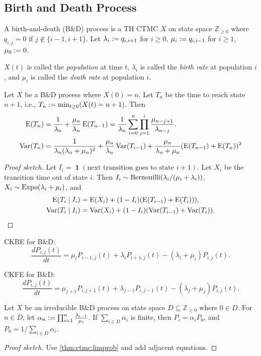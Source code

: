 \documentclass[a4paper, 12pt, fleqn]{article}
\DeclareMathOperator{\boolone}{\mathbf{1}}
\DeclareMathOperator{\Expo}{\opname{Expo}}
\begin{document}
\subsection{Birth and Death Process}

\begin{definition}
A birth-and-death (B\&D) process is a TH CTMC $X$ on state space $\mathbb{Z}_{\ge 0}$ where
$q_{i,j} = 0$ if $j \not\in \{i-1, i+1\}$. Let $\lambda_i := q_{i,i+1}$ for $i \ge 0$,
$\mu_i := q_{i,i-1}$ for $i \ge 1$, $\mu_0 := 0$.

$X(t)$ is called the \emph{population} at time $t$,
$\lambda_i$ is called the \emph{birth rate} at population $i$,
and $\mu_i$ is called the \emph{death rate} at population $i$.
\end{definition}

\begin{lemma}
Let $X$ be a B\&D process where $X(0)=n$.
Let $T_n$ be the time to reach state $n+1$, i.e., $T_n := \min_{t \ge 0} (X(t) = n+1)$. Then
\begin{align*}
\operatorname*{E}(T_n) &= \frac{1}{\lambda_n} + \frac{\mu_n}{\lambda_n}\operatorname*{E}(T_{n-1})
= \frac{1}{\lambda_n}\sum_{i=0}^n \prod_{j=1}^i \frac{\mu_{n-j+1}}{\lambda_{n-j}}.
\\ \operatorname*{Var}(T_n) &= \frac{1}{\lambda_n(\lambda_n + \mu_n)^2} + \frac{\mu_n}{\lambda_n}\operatorname*{Var}(T_{i-1})
    + \frac{\mu_n}{\lambda_n + \mu_n}(\operatorname*{E}(T_{n-1}) + \operatorname*{E}(T_n))^2
\end{align*}
\end{lemma}
\begin{proof}[Proof sketch]
Let $I_i = \boolone(\textrm{next transition goes to state } i+1)$.
Let $X_i$ be the transition time out of state $i$.
Then $I_i \sim \operatorname{Bernouilli}(\lambda_i/(\mu_i + \lambda_i))$,
$X_i \sim \Expo(\lambda_i + \mu_i)$, and
\begin{align*}
\operatorname*{E}(T_i \mid I_i) &= \operatorname*{E}(X_i) + (1-I_i)(\operatorname*{E}(T_{i-1}) + \operatorname*{E}(T_i))),
\\ \operatorname*{Var}(T_i \mid I_i) &= \operatorname*{Var}(X_i) + (1-I_i)(\operatorname*{Var}(T_{i-1}) + \operatorname*{Var}(T_i)).
\qedhere \end{align*}
\end{proof}

CKBE for B\&D:
\[ \frac{dP_{i,j}(t)}{dt} = \mu_iP_{i-1,j}(t) + \lambda_iP_{i+1,j}(t) - (\lambda_i + \mu_i)P_{i,j}(t). \]

CKFE for B\&D:
\[ \frac{dP_{i,j}(t)}{dt} = \mu_{j+1}P_{i,j+1}(t) + \lambda_{j-1}P_{i,j-1}(t) - (\lambda_j + \mu_j)P_{i,j}(t). \]

\begin{theorem}
Let $X$ be an irreducible B\&D process on state space $D \subseteq \mathbb{Z}_{\ge 0}$ where $0 \in D$.
For $n \in D$, let $\alpha_n := \prod_{i=1}^n \frac{\lambda_{i-1}}{\mu_i}$.
If $\sum_{i \in D} \alpha_i$ is finite, then
$P_i = \alpha_iP_0$, and $P_0 = 1/\sum_{i \in D} \alpha_i$.
\end{theorem}
\begin{proof}[Proof sketch]
Use \cref{thm:ctmc:limprob} and add adjacent equations.
\end{proof}
\end{document}
